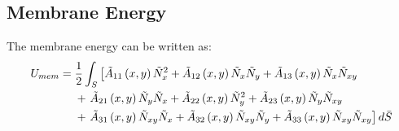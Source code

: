 \documentclass[journal]{new-aiaa}
\begin{document}
\subsection{Membrane Energy}
The membrane energy can be written as:
\begin{align}
	{U}_{mem}={}& 
	\frac{1}{2}\int_{S}\left[\tilde{A}_{11}\left(x,y\right)\tilde{N}_x^2 + \tilde{A}_{12}\left(x,y\right)\tilde{N}_x\tilde{N}_y + \tilde{A}_{13}\left(x,y\right)\tilde{N}_x\tilde{N}_{xy}  \right. \notag\\ &+ \left. \tilde{A}_{21}\left(x,y\right)\tilde{N}_y\tilde{N}_x + \tilde{A}_{22}\left(x,y\right)\tilde{N}_y^2 + \tilde{A}_{23}\left(x,y\right)\tilde{N}_y\tilde{N}_{xy} \right. \notag\\ &+ \left. \tilde{A}_{31}\left(x,y\right)\tilde{N}_{xy}\tilde{N}_x + \tilde{A}_{32}\left(x,y\right)\tilde{N}_{xy}\tilde{N}_{y}+ \tilde{A}_{33}\left(x,y\right)\tilde{N}_{xy}\tilde{N}_{xy}\right]d\bar{S}
	\label{eq:energy}
\end{align}
\end{document}
